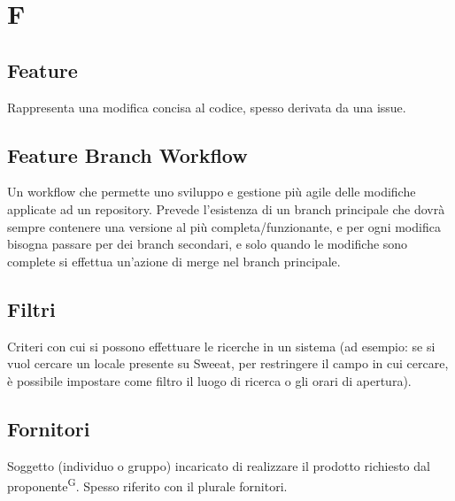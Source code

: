 \section{F}

\subsection{Feature}
Rappresenta una modifica concisa al codice, spesso derivata da una issue.

\subsection{Feature Branch Workflow}
Un workflow che permette uno sviluppo e gestione più agile delle modifiche applicate ad un repository. Prevede l'esistenza di un branch principale che dovrà sempre contenere una versione al più completa/funzionante, e per ogni modifica bisogna passare per dei branch secondari, e solo quando le modifiche sono complete si effettua un'azione di merge nel branch principale.

\subsection{Filtri} Criteri con cui si possono effettuare le ricerche in un sistema (ad esempio: se si vuol cercare un locale presente su Sweeat, per restringere il campo in cui cercare, è possibile impostare come filtro il luogo di ricerca o gli orari di apertura).

\subsection{Fornitori}
Soggetto (individuo o gruppo) incaricato di realizzare il prodotto richiesto dal proponente\textsuperscript{G}. Spesso riferito con il plurale fornitori.



\clearpage